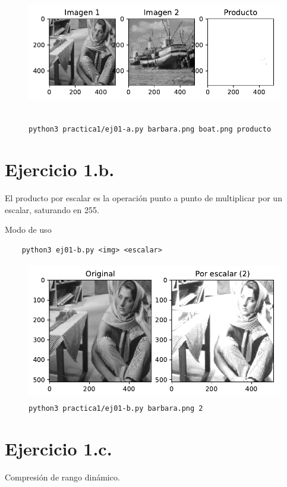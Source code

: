 \documentclass[11pt, spanish]{article}
\begin{document}
\begin{figure}[H]
\centering
  \includegraphics[height=6cm]{informe-imgs/ej01-a-producto.pdf}
  \caption{\texttt{python3 practica1/ej01-a.py barbara.png boat.png producto}}
\end{figure}


\section{Ejercicio 1.b.}

El producto por escalar es la operación punto a punto de multiplicar por un escalar, saturando en 255.

Modo de uso
\begin{verbatim}
    python3 ej01-b.py <img> <escalar>
\end{verbatim}


\begin{figure}[H]
\centering
  \includegraphics[height=6cm]{informe-imgs/ej01-b.pdf}
  \caption{\texttt{python3 practica1/ej01-b.py barbara.png 2}}
\end{figure}


\section{Ejercicio 1.c.}
Compresión de rango dinámico.
\end{document}
